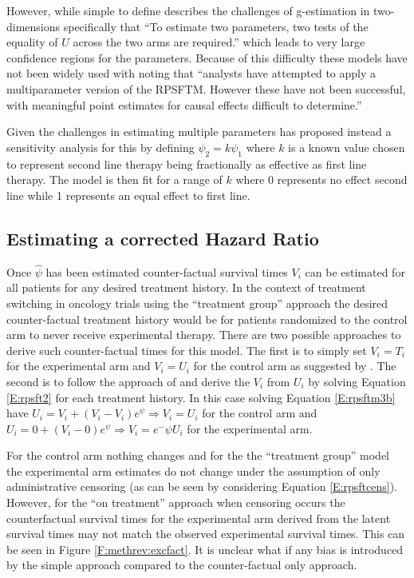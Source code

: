 However, while simple to define \cite{White1999} describes the challenges of g-estimation in two-dimensions specifically that ``To estimate two parameters, two tests of the equality of $U$ across the two arms are required.'' which leads to very large confidence regions for the parameters. Because of this difficulty these models have not been widely used with \cite{TSD16} noting that ``analysts have attempted to apply a multiparameter version of the RPSFTM. However these have not been successful, with meaningful point estimates for causal effects difficult to determine.'' 

Given the challenges in estimating multiple parameters \cite{White2014} has proposed instead a sensitivity analysis for this by defining $\psi_2 = k\psi_1$ where $k$ is a known value chosen to represent second line therapy being fractionally as effective as first line therapy. The model is then fit for a range of $k$ where 0 represents no effect second line while 1 represents an equal effect to first line.

\subsection{Estimating a corrected Hazard Ratio}
\label{S:chap_methrev:RPSFTestHR}

Once $\hat{\psi}$ has been estimated counter-factual survival times $V_i$ can be estimated for all patients for any desired treatment history. In the context of treatment switching in oncology trials using the ``treatment group'' approach the desired counter-factual treatment history would be for patients randomized to the control arm to never receive experimental therapy. There are two possible approaches to derive such counter-factual times for this model. The first is to simply set $V_i=T_i$ for the experimental arm and $V_i=U_i$ for the control arm as suggested by \cite{Latimer2014}. The second is to follow the approach of \cite{Robins1991} and derive the $V_i$ from $U_i$ by solving Equation \ref{E:rpsft2} for each treatment history. In this case solving Equation \ref{E:rpsftm3b} have $U_i = V_i + (V_i - V_i)e^\psi \Rightarrow V_i = U_i$ for the control arm and $U_i = 0 + (V_i - 0)e^\psi \Rightarrow V_i = e^-\psi U_i$ for the experimental arm. 


For the control arm nothing changes and for the the ``treatment group'' model the experimental arm estimates do not change under the assumption of only administrative censoring (as can be seen by considering Equation \ref{E:rpsftcens}). However, for the ``on treatment'' approach when censoring occurs the counterfactual survival times for the experimental arm derived from the latent survival times may not match the observed experimental survival times. This can be seen in Figure \ref{F:methrev:excfact}. It is unclear what if any bias is introduced by the simple approach compared to the counter-factual only approach. 

